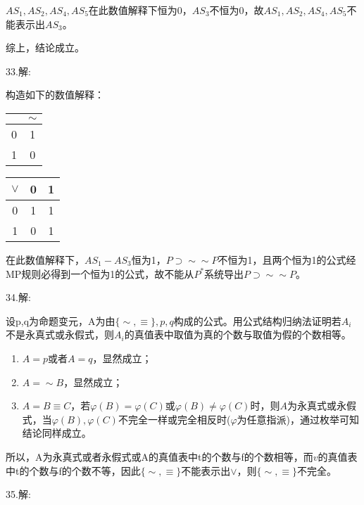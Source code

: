 \documentclass[a4paper]{ctexart}
\begin{document}
\begin{enumerate}
  $AS_1,AS_2,AS_4,AS_5$在此数值解释下恒为0，$AS_3$不恒为0，故$AS_1,AS_2,AS_4,AS_5$不能表示出$AS_3$。
  
  综上，结论成立。
\end{enumerate}

\noindent 33.解:

构造如下的数值解释：
\begin{table}[!hbp]
  \begin{tabular}{c|c}
    & $\sim$ \\
    \hline
    0 & 1 \\
    1 & 0 \\
  \end{tabular}
  \hfil
  \begin{tabular}{c|cc}
    $\vee$ & 0 & 1  \\
    \hline
    0 & 1 & 1  \\
    1 & 0 & 1  \\
  \end{tabular}    
\end{table}

在此数值解释下，$AS_1-AS_3$恒为1，$P\supset \sim\sim P$不恒为1，且两个恒为1的公式经MP规则必得到一个恒为1的公式，故不能从$P^*$系统导出$P\supset \sim\sim P$。

\noindent 34.解:

设p,q为命题变元，A为由$\{\sim,\equiv\},p,q$构成的公式。用公式结构归纳法证明若$A_i$不是永真式或永假式，则$A_i$的真值表中取值为真的个数与取值为假的个数相等。
\begin{enumerate}
  \item $A=p$或者$A=q$，显然成立；
  \item $A=\sim B$，显然成立；
  \item $A=B\equiv C$，若$\varphi(B)=\varphi(C)$或$\varphi(B)\neq\varphi(C)$时，则$A$为永真式或永假式，当$\varphi(B),\varphi(C)$不完全一样或完全相反时($\varphi$为任意指派)，通过枚举可知结论同样成立。
\end{enumerate}
所以，A为永真式或者永假式或A的真值表中t的个数与f的个数相等，而$v$的真值表中t的个数与f的个数不等，因此$\{\sim,\equiv\}$不能表示出$\vee$，则$\{\sim,\equiv\}$不完全。\newline

\noindent 35.解:
\end{document}
